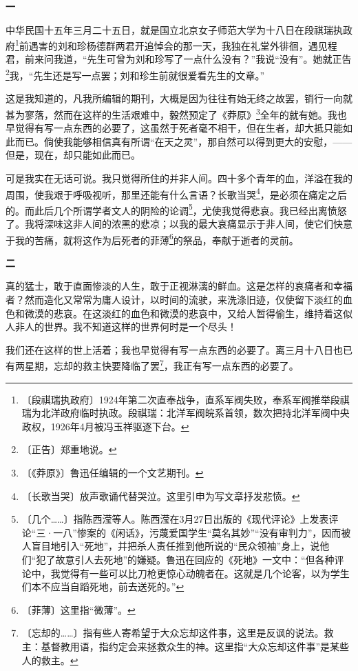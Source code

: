 \documentclass[12pt,UTF-8,openany]{ctexbook}
\begin{document}
\begin{large}
    
    \begin{center}\textbf{一}\end{center}
    
    中华民国十五年三月二十五日，就是国立北京女子师范大学为十八日在段祺瑞执政府\footnote{〔段祺瑞执政府〕1924年第二次直奉战争，直系军阀失败，奉系军阀推举段祺瑞为北洋政府临时执政。段祺瑞：北洋军阀皖系首领，数次把持北洋军阀中央政权，1926年4月被冯玉祥驱逐下台。}前遇害的刘和珍杨德群两君开追悼会的那一天，我独在礼堂外徘徊，遇见程君，前来问我道，“先生可曾为刘和珍写了一点什么没有？”我说“没有”。她就正告\footnote{〔正告〕郑重地说。}我，“先生还是写一点罢；刘和珍生前就很爱看先生的文章。”
    
    这是我知道的，凡我所编辑的期刊，大概是因为往往有始无终之故罢，销行一向就甚为寥落，然而在这样的生活艰难中，毅然预定了《莽原》\footnote{〔《莽原》〕鲁迅任编辑的一个文艺期刊。}全年的就有她。我也早觉得有写一点东西的必要了，这虽然于死者毫不相干，但在生者，却大抵只能如此而已。倘使我能够相信真有所谓“在天之灵”，那自然可以得到更大的安慰，——但是，现在，却只能如此而已。
    
    可是我实在无话可说。我只觉得所住的并非人间。四十多个青年的血，洋溢在我的周围，使我艰于呼吸视听，那里还能有什么言语？长歌当哭\footnote{〔长歌当哭〕放声歌诵代替哭泣。这里引申为写文章抒发悲愤。}，是必须在痛定之后的。而此后几个所谓学者文人的阴险的论调\footnote{〔几个……〕指陈西滢等人。陈西滢在3月27日出版的《现代评论》上发表评论“三·一八”惨案的《闲话》，污蔑爱国学生“莫名其妙”“没有审判力”，因而被人盲目地引入“死地”，并把杀人责任推到他所说的“民众领袖”身上，说他们“犯了故意引人去死地”的嫌疑。鲁迅在回应的《死地》一文中：“但各种评论中，我觉得有一些可以比刀枪更惊心动魄者在。这就是几个论客，以为学生们本不应当自蹈死地，前去送死的。”}，尤使我觉得悲哀。我已经出离愤怒了。我将深味这非人间的浓黑的悲凉；以我的最大哀痛显示于非人间，使它们快意于我的苦痛，就将这作为后死者的菲薄\footnote{〔菲薄〕这里指“微薄”。}的祭品，奉献于逝者的灵前。
    
    \begin{center}\textbf{二}\end{center}
    
    真的猛士，敢于直面惨淡的人生，敢于正视淋漓的鲜血。这是怎样的哀痛者和幸福者？然而造化又常常为庸人设计，以时间的流驶，来洗涤旧迹，仅使留下淡红的血色和微漠的悲哀。在这淡红的血色和微漠的悲哀中，又给人暂得偷生，维持着这似人非人的世界。我不知道这样的世界何时是一个尽头！
    
    我们还在这样的世上活着；我也早觉得有写一点东西的必要了。离三月十八日也已有两星期，忘却的救主快要降临了罢\footnote{〔忘却的……〕指有些人寄希望于大众忘却这件事，这里是反讽的说法。救主：基督教用语，指约定会来拯救众生的神。这里指“大众忘却这件事”是某些人的救主。}，我正有写一点东西的必要了。
    

\end{large}
\end{document}
